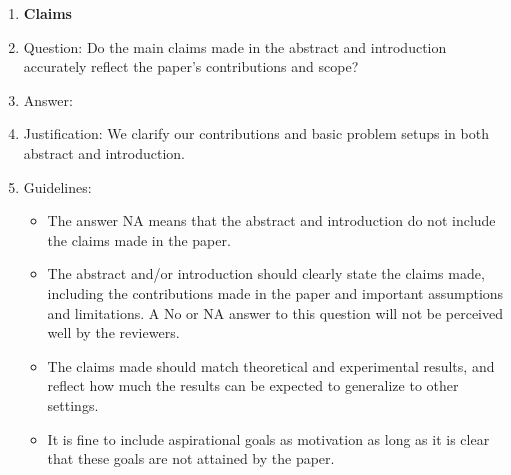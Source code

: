 \documentclass{article}
\theoremstyle{definition}
\begin{document}
\begin{enumerate}

\item {\bf Claims}
    \item[] Question: Do the main claims made in the abstract and introduction accurately reflect the paper's contributions and scope?
    \item[] Answer: \answerYes{} %
    \item[] Justification: We clarify our contributions and basic problem setups in both abstract and introduction.
    \item[] Guidelines:
    \begin{itemize}
        \item The answer NA means that the abstract and introduction do not include the claims made in the paper.
        \item The abstract and/or introduction should clearly state the claims made, including the contributions made in the paper and important assumptions and limitations. A No or NA answer to this question will not be perceived well by the reviewers. 
        \item The claims made should match theoretical and experimental results, and reflect how much the results can be expected to generalize to other settings. 
        \item It is fine to include aspirational goals as motivation as long as it is clear that these goals are not attained by the paper. 
    \end{itemize}


\end{enumerate}
\end{document}
